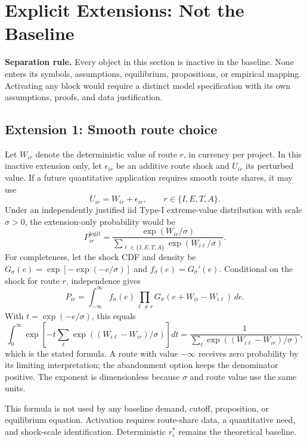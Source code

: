 \section{Explicit Extensions: Not the Baseline}
\label{sec:p11-extensions}

\textbf{Separation rule.} Every object in this section is inactive in the
baseline. None enters its symbols, assumptions, equilibrium, propositions, or
empirical mapping. Activating any block would require a distinct model
specification with its own assumptions, proofs, and data justification.

\subsection{Extension 1: Smooth route choice}
\label{subsec:p11-smooth-choice}

Let \(W_{ir}\) denote the deterministic value of route \(r\), in currency
per project. In this inactive extension only, let \(\epsilon_{ir}\) be an
additive route shock and \(U_{ir}\) its perturbed value. If a future
quantitative application requires smooth route shares, it may use
\[
  U_{ir}=W_{ir}+\epsilon_{ir},
  \qquad r\in\{I,E,T,A\}.
\]
Under an independently justified iid Type-I extreme-value distribution with
scale \(\sigma>0\), the extension-only probability would be
\begin{equation}
  P_{ir}^{\mathrm{logit}}
  =
  \frac{\exp(W_{ir}/\sigma)}
  {\sum_{\ell\in\{I,E,T,A\}}\exp(W_{i\ell}/\sigma)}.
  \label{eq:p11-logit-extension}
\end{equation}
For completeness, let the shock CDF and density be
\(G_\sigma(e)=\exp[-\exp(-e/\sigma)]\) and
\(f_\sigma(e)=G_\sigma'(e)\). Conditional on the shock for route \(r\),
independence gives
\[
 P_{ir}=\int_{-\infty}^{\infty} f_\sigma(e)
 \prod_{\ell\ne r}G_\sigma(e+W_{ir}-W_{i\ell})\,de.
\]
With \(t=\exp(-e/\sigma)\), this equals
\[
 \int_0^\infty
 \exp\!\left[-t\sum_\ell\exp((W_{i\ell}-W_{ir})/\sigma)\right]dt
 =\frac{1}{\sum_\ell\exp((W_{i\ell}-W_{ir})/\sigma)},
\]
which is the stated formula. A route with value \(-\infty\) receives zero
probability by its limiting interpretation; the abandonment option keeps the
denominator positive. The exponent is dimensionless because \(\sigma\) and
route value use the same units.

This formula is not used by any baseline demand, cutoff, proposition, or
equilibrium equation. Activation requires route-share data, a quantitative
need, and shock-scale identification. Deterministic
\(r_i^*\) remains the theoretical baseline.

